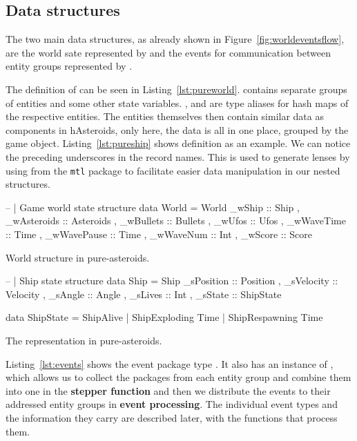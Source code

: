 \documentclass[
  digital, %
  color,   %
  table,   %
  oneside, %
  lof,     %
  lot,     %
]{fithesis3}
\newcommand{\packagename}{\texttt}
\begin{document}
\subsection{Data structures}
The two main data structures, as already shown in Figure~\ref{fig:worldeventsflow},
are the world sate represented by  and the events for communication
between entity groups represented by .

The definition of  can be seen in Listing~\ref{lst:pureworld}.
 contains separate groups of entities and some other state variables.
,  and  are type
aliases for hash maps of the respective entities.
The entities themselves then contain similar data as components in hAsteroids,
only here, the data is all in one place, grouped by the game object.
Listing~\ref{lst:pureship} shows  definition as an example.
We can notice the preceding underscores in the record names. This is used
to generate lenses by using  from the \packagename{mtl} package
to facilitate easier data manipulation in our nested structures.

\begin{listing}[H]
\begin{haskell}
-- | Game world state structure 
data World =
    World
    { _wShip      :: Ship 
    , _wAsteroids :: Asteroids
    , _wBullets   :: Bullets
    , _wUfos      :: Ufos
    , _wWaveTime  :: Time
    , _wWavePause :: Time
    , _wWaveNum   :: Int
    , _wScore     :: Score
    }
\end{haskell}
\caption{World structure in pure-asteroids.}
\label{lst:pureworld}
\end{listing}

\begin{listing}[H]
\begin{haskell}
-- | Ship state structure
data Ship =
    Ship 
    { _sPosition :: Position
    , _sVelocity :: Velocity
    , _sAngle    :: Angle
    , _sLives    :: Int
    , _sState    :: ShipState
    }

data ShipState
    = ShipAlive
    | ShipExploding Time
    | ShipRespawning Time
\end{haskell}
\caption{The  representation in pure-asteroids.}
\label{lst:pureship}
\end{listing}

Listing~\ref{lst:events} shows the event package type .
It also has an instance of , which allows us to collect the packages from
each entity group and combine them into one in the \textbf{stepper function}
and then we distribute the events to their addressed entity groups in \textbf{event processing}.
The individual event types and the information they carry are described later,
with the functions that process them.
\end{document}
